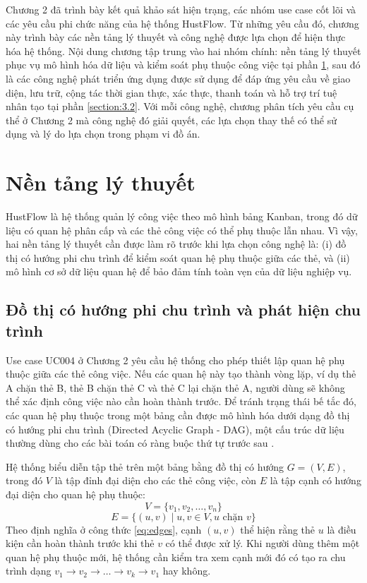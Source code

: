 \documentclass[../DoAn.tex]{subfiles}
\begin{document}
Chương 2 đã trình bày kết quả khảo sát hiện trạng, các nhóm use case cốt lõi và các yêu cầu phi chức năng của hệ thống HustFlow. Từ những yêu cầu đó, chương này trình bày các nền tảng lý thuyết và công nghệ được lựa chọn để hiện thực hóa hệ thống. Nội dung chương tập trung vào hai nhóm chính: nền tảng lý thuyết phục vụ mô hình hóa dữ liệu và kiểm soát phụ thuộc công việc tại phần \ref{section:3.1}, sau đó là các công nghệ phát triển ứng dụng được sử dụng để đáp ứng yêu cầu về giao diện, lưu trữ, cộng tác thời gian thực, xác thực, thanh toán và hỗ trợ trí tuệ nhân tạo tại phần \ref{section:3.2}. Với mỗi công nghệ, chương phân tích yêu cầu cụ thể ở Chương 2 mà công nghệ đó giải quyết, các lựa chọn thay thế có thể sử dụng và lý do lựa chọn trong phạm vi đồ án.

\section{Nền tảng lý thuyết}
\label{section:3.1}

HustFlow là hệ thống quản lý công việc theo mô hình bảng Kanban, trong đó dữ liệu có quan hệ phân cấp và các thẻ công việc có thể phụ thuộc lẫn nhau. Vì vậy, hai nền tảng lý thuyết cần được làm rõ trước khi lựa chọn công nghệ là: (i) đồ thị có hướng phi chu trình để kiểm soát quan hệ phụ thuộc giữa các thẻ, và (ii) mô hình cơ sở dữ liệu quan hệ để bảo đảm tính toàn vẹn của dữ liệu nghiệp vụ.

\subsection{Đồ thị có hướng phi chu trình và phát hiện chu trình}
\label{subsection:3.1.1}

Use case UC004 ở Chương 2 yêu cầu hệ thống cho phép thiết lập quan hệ phụ thuộc giữa các thẻ công việc. Nếu các quan hệ này tạo thành vòng lặp, ví dụ thẻ A chặn thẻ B, thẻ B chặn thẻ C và thẻ C lại chặn thẻ A, người dùng sẽ không thể xác định công việc nào cần hoàn thành trước. Để tránh trạng thái bế tắc đó, các quan hệ phụ thuộc trong một bảng cần được mô hình hóa dưới dạng đồ thị có hướng phi chu trình (Directed Acyclic Graph - DAG), một cấu trúc dữ liệu thường dùng cho các bài toán có ràng buộc thứ tự trước sau \cite{cormen2009algorithms}.

Hệ thống biểu diễn tập thẻ trên một bảng bằng đồ thị có hướng $G = (V, E)$, trong đó $V$ là tập đỉnh đại diện cho các thẻ công việc, còn $E$ là tập cạnh có hướng đại diện cho quan hệ phụ thuộc:
\begin{equation}\label{eq:vertices}
    V = \{v_1, v_2, \dots, v_n\}
\end{equation}
\begin{equation}\label{eq:edges}
    E = \{(u, v) \mid u, v \in V, u \text{ chặn } v\}
\end{equation}
Theo định nghĩa ở công thức \eqref{eq:edges}, cạnh $(u, v)$ thể hiện rằng thẻ $u$ là điều kiện cần hoàn thành trước khi thẻ $v$ có thể được xử lý. Khi người dùng thêm một quan hệ phụ thuộc mới, hệ thống cần kiểm tra xem cạnh mới đó có tạo ra chu trình dạng $v_1 \rightarrow v_2 \rightarrow \dots \rightarrow v_k \rightarrow v_1$ hay không.
\end{document}
